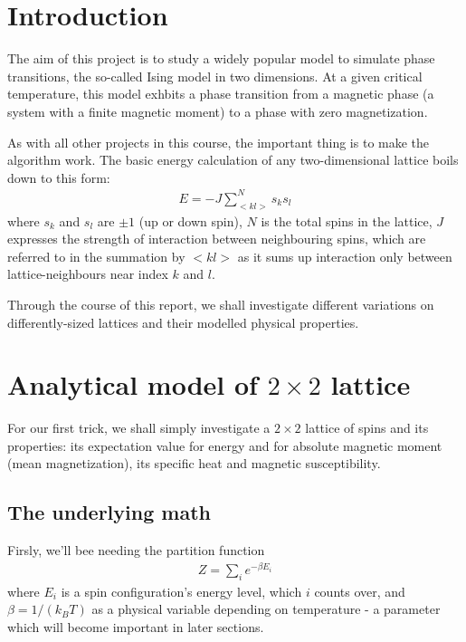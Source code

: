 \documentclass[11pt,a4paper,notitlepage,twocolumn]{article}
\begin{document}
\section{Introduction}
The aim of this project is to study a widely popular model to simulate phase transitions, the so-called Ising model in two dimensions. At a given critical temperature, this model exhbits a phase transition from a magnetic phase (a system with a finite magnetic moment) to a phase with zero magnetization.

As with all other projects in this course, the important thing is to make the algorithm work. The basic energy calculation of any two-dimensional lattice boils down to this form:
\begin{align}\label{eq:energysummation}
E = -J \sum^N_{<kl>} s_ks_l
\end{align}
where $s_k$ and $s_l$ are $\pm 1$ (up or down spin), $N$ is the total spins in the lattice, $J$ expresses the strength of interaction between neighbouring spins, which are referred to in the summation by $<kl>$ as it sums up interaction only between lattice-neighbours near index $k$ and $l$.

Through the course of this report, we shall investigate different variations on differently-sized lattices and their modelled physical properties.

\section{Analytical model of $2\times2$ lattice}
For our first trick, we shall simply investigate a $2\times2$ lattice of spins and its properties: its expectation value for energy and for absolute magnetic moment (mean magnetization), its  specific heat and magnetic susceptibility.

\subsection{The underlying math}
Firsly, we'll bee needing the partition function
\begin{align}\label{eq:partitionfunc}
Z = \sum_i e^{-\beta E_i}
\end{align}
where $E_i$ is a spin configuration's energy level, which $i$ counts over, and $\beta = 1/(k_B T)$ as a physical variable depending on temperature - a parameter which will become important in later sections.
\end{document}
